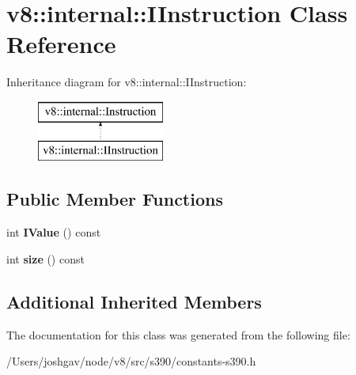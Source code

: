 \hypertarget{classv8_1_1internal_1_1_i_instruction}{}\section{v8\+:\+:internal\+:\+:I\+Instruction Class Reference}
\label{classv8_1_1internal_1_1_i_instruction}
Inheritance diagram for v8\+:\+:internal\+:\+:I\+Instruction\+:\begin{figure}[H]
\begin{center}
\leavevmode
\includegraphics[height=2.000000cm]{classv8_1_1internal_1_1_i_instruction}
\end{center}
\end{figure}
\subsection*{Public Member Functions}
\begin{DoxyCompactItemize}
\item 
int {\bfseries I\+Value} () const \hypertarget{classv8_1_1internal_1_1_i_instruction_a1c8be19ede2bc72000e1511173ad6f77}{}\label{classv8_1_1internal_1_1_i_instruction_a1c8be19ede2bc72000e1511173ad6f77}

\item 
int {\bfseries size} () const \hypertarget{classv8_1_1internal_1_1_i_instruction_a3f16662bf36972e423c02d28d338e98a}{}\label{classv8_1_1internal_1_1_i_instruction_a3f16662bf36972e423c02d28d338e98a}

\end{DoxyCompactItemize}
\subsection*{Additional Inherited Members}


The documentation for this class was generated from the following file\+:\begin{DoxyCompactItemize}
\item 
/\+Users/joshgav/node/v8/src/s390/constants-\/s390.\+h\end{DoxyCompactItemize}
